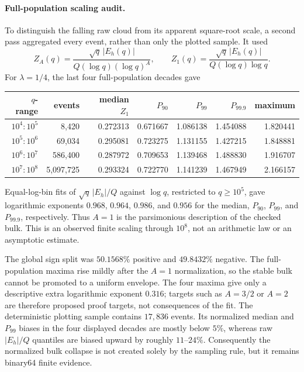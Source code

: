 \documentclass[11pt,a4paper]{article}
\numberwithin{equation}{section}
\theoremstyle{definition}
\begin{document}
\paragraph{Full-population scaling audit.}
To distinguish the falling raw cloud from its apparent square-root scale, a
second pass aggregated every event, rather than only the plotted sample.  It
used
\begin{equation}\label{eq:ZA-scaling-audit}
 Z_A(q)=\frac{\sqrt q\,|E_h(q)|}{Q(\log q)(\log q)^A},
 \qquad
 Z_1(q)=\frac{\sqrt q\,|E_h(q)|}{Q(\log q)\log q}.
\end{equation}
For \(\lambda=1/4\), the last four full-population decades gave
\begin{center}
\small
\begin{tabular}{rrrrrrr}
\toprule
\(q\)-range & events & median \(Z_1\) & \(P_{90}\) & \(P_{99}\) &
\(P_{99.9}\) & maximum\\
\midrule
\(10^4\!:\!10^5\) & 8,420 & 0.272313 & 0.671667 & 1.086138 & 1.454088 & 1.820441\\
\(10^5\!:\!10^6\) & 69,034 & 0.295081 & 0.723275 & 1.131155 & 1.427215 & 1.848881\\
\(10^6\!:\!10^7\) & 586,400 & 0.287972 & 0.709653 & 1.139468 & 1.488830 & 1.916707\\
\(10^7\!:\!10^8\) & 5,097,725 & 0.293324 & 0.722770 & 1.141239 & 1.467949 & 2.166157\\
\bottomrule
\end{tabular}
\end{center}
Equal-log-bin fits of \(\sqrt q\,|E_h|/Q\) against \(\log q\), restricted
to \(q\ge10^5\), gave logarithmic exponents \(0.968\), \(0.964\),
\(0.986\), and \(0.956\) for the median, \(P_{90}\), \(P_{99}\), and
\(P_{99.9}\), respectively.  Thus \(A=1\) is the parsimonious description
of the checked bulk.  This is an observed finite scaling through \(10^8\),
not an arithmetic law or an asymptotic estimate.

The global sign split was \(50.1568\%\) positive and \(49.8432\%\)
negative.  The full-population maxima rise mildly after the \(A=1\)
normalization, so the stable bulk cannot be promoted to a uniform envelope.
The four maxima give only a descriptive extra logarithmic exponent
\(0.316\); targets such as \(A=3/2\) or \(A=2\) are therefore proposed proof
targets, not consequences of the fit.  The deterministic plotting sample
contains \(17,836\) events.  Its normalized median and \(P_{99}\) biases in
the four displayed decades are mostly below \(5\%\), whereas raw
\(|E_h|/Q\) quantiles are biased upward by roughly \(11\)--\(24\%\).
Consequently the normalized bulk collapse is not created solely by the
sampling rule, but it remains binary64 finite evidence.
\end{document}
